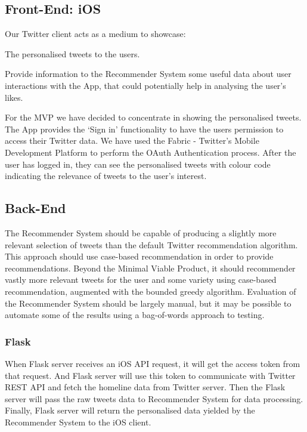 \documentclass{article}
\begin{document}
\subsection{Front-End: iOS}
Our Twitter client acts as a medium to showcase:

\begin{itemize*}
	\item The personalised tweets to the users.
	\item Provide information to the Recommender System some useful data about user interactions with the App, that could potentially help in analysing the user's likes.
\end{itemize*}

\noindent For the MVP we have decided to concentrate in showing the personalised tweets.
The App provides the ‘Sign in’ functionality to have the users permission to access their 
Twitter data. We have used the Fabric - Twitter’s Mobile Development Platform to perform the OAuth Authentication process. After the user has logged in, they can see the personalised tweets with colour code indicating the relevance of tweets to the user's interest. 


\subsection{Back-End}

The Recommender System should be capable of producing a slightly more relevant selection of tweets than the default Twitter recommendation algorithm. This approach should use case-based recommendation in order to provide recommendations. Beyond the Minimal Viable Product, it should recommender vastly more relevant tweets for the user and some variety using case-based recommendation, augmented with the bounded greedy algorithm. Evaluation of the Recommender System should be largely manual, but it may be possible to automate some of the results using a bag-of-words approach to testing.

\subsubsection*{Flask}
When Flask server receives an iOS API request, it will get the access token from that request. And Flask server will use this token to communicate with Twitter REST API and fetch the homeline data from Twitter server. Then the Flask server will pass the raw tweets data to Recommender System for data processing. Finally, Flask server will return the personalised data yielded by the Recommender System to the iOS client.
\end{document}
